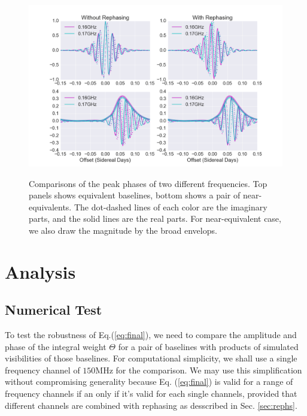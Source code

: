 \documentclass[preprint2,numberedappendix,tighten,twocolappendix]{aastex6}  %
\renewcommand\[{\begin{equation}}
\renewcommand\]{\end{equation}}
\begin{document}
\begin{figure}[H]
\includegraphics[width=1.1\linewidth]{rephs}
\label{fig:freqdiff}
\caption{Comparisons of the peak phases of two different frequencies. Top panels shows equivalent baselines, bottom shows a pair of near-equivalents. The dot-dashed lines of each color are the imaginary parts, and the solid lines are the real parts. For near-equivalent case, we also draw the magnitude by the broad envelops. }
\end{figure}


\section{Analysis}
\subsection{Numerical Test \label{sec:Techniquet}}

To test the robustness of Eq.(\ref{eq:final}), we need to compare the amplitude and phase of the integral weight $\Theta$ 
for a pair of baselines with products of simulated visibilities of those baselines. For computational simplicity, we shall use a single frequency channel of $150$MHz for the comparison. We may use this simplification without compromising generality because Eq. (\ref{eq:final}) is valid for a range of frequency channels if an only if it's valid for each single channels, provided that different channels are combined with rephasing as desscribed in Sec. \ref{sec:rephs}. 
\end{document}
